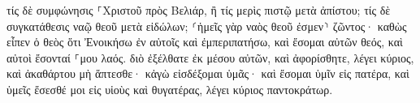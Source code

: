 \documentclass{openreader}
\begin{document}
τίς δὲ συμφώνησις ⸀Χριστοῦ πρὸς Βελιάρ, ἢ τίς μερὶς πιστῷ μετὰ ἀπίστου; 
τίς δὲ συγκατάθεσις ναῷ θεοῦ μετὰ εἰδώλων; ⸂ἡμεῖς γὰρ ναὸς θεοῦ ἐσμεν⸃ ζῶντος· καθὼς εἶπεν ὁ θεὸς ὅτι Ἐνοικήσω ἐν αὐτοῖς καὶ ἐμπεριπατήσω, καὶ ἔσομαι αὐτῶν θεός, καὶ αὐτοὶ ἔσονταί ⸀μου λαός. 
διὸ ἐξέλθατε ἐκ μέσου αὐτῶν, καὶ ἀφορίσθητε, λέγει κύριος, καὶ ἀκαθάρτου μὴ ἅπτεσθε· κἀγὼ εἰσδέξομαι ὑμᾶς· 
καὶ ἔσομαι ὑμῖν εἰς πατέρα, καὶ ὑμεῖς ἔσεσθέ μοι εἰς υἱοὺς καὶ θυγατέρας, λέγει κύριος παντοκράτωρ. 
\end{document}
